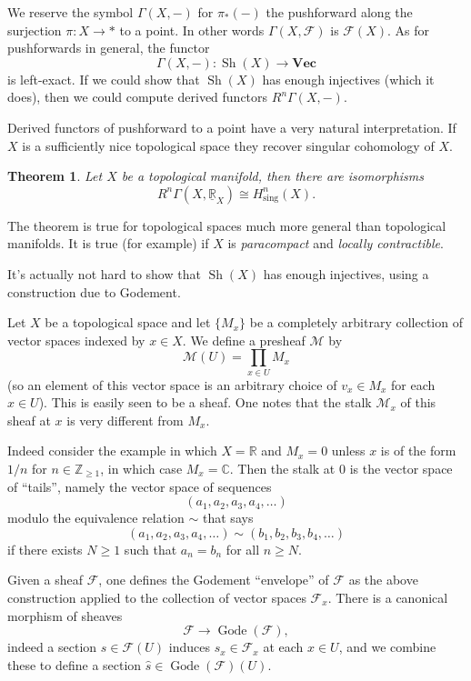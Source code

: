 \documentclass[12pt]{article}
\theoremstyle{plain}
\newtheorem{thm}{Theorem}[section]
\theoremstyle{definition}
\numberwithin{equation}{section}
\DeclareMathOperator{\Gode}{Gode}
\DeclareMathOperator{\sheaves}{Sh}
\newcommand{\C}{\mathbb{C}}
\newcommand{\R}{\mathbb{R}}
\newcommand{\Z}{\mathbb{Z}}
\newcommand{\CF}{\mathcal{F}}
\newcommand{\CM}{\mathcal{M}}
\newcommand{\Vect}{\mathbf{Vec}}
\begin{document}
We reserve the symbol $\Gamma(X, -)$ for $\pi_*(-)$ the pushforward along the surjection $\pi : X \rightarrow *$ to a point. In other words $\Gamma(X, \CF)$ is $\CF(X)$. As for pushforwards in general, the functor
\[
\Gamma(X, -) : \sheaves(X) \rightarrow \Vect
\]
is left-exact. If we could show that $\sheaves(X)$ has enough injectives (which it does), then we could compute derived functors $R^n\Gamma(X, -)$.

Derived functors of pushforward to a point have a very natural interpretation. If $X$ is a sufficiently nice topological space they recover singular cohomology of $X$.
\begin{thm}\label{thm:sheaf-sing-coho}
Let $X$ be a topological manifold, then there are isomorphisms
\[
R^n\Gamma(X, \underline{\R}_X) \cong H_{\text{sing}}^n(X).
\]
\end{thm}
The theorem is true for topological spaces much more general than topological manifolds. It is true (for example) if $X$ is \emph{paracompact} and \emph{locally contractible}.

It's actually not hard to show that $\sheaves(X)$ has enough injectives, using a construction due to Godement.

Let $X$ be a topological space and let $\{M_x\}$ be a completely arbitrary collection of vector spaces indexed by $x \in X$. We define a presheaf $\CM$ by
\[
\CM(U) = \prod_{x \in U} M_x
\]
(so an element of this vector space is an arbitrary choice of $v_x \in M_x$ for each $x \in U$). This is easily seen to be a sheaf. One notes that the stalk $\CM_x$ of this sheaf at $x$ is very different from $M_x$.

Indeed consider the example in which $X = \R$ and $M_x = 0$ unless $x$ is of the form $1/n$ for $n \in \Z_{\geq 1}$, in which case $M_x = \C$. Then the stalk at $0$ is the vector space of ``tails'', namely the vector space of sequences
\[
(a_1, a_2, a_3, a_4, \ldots)
\]
modulo the equivalence relation $\sim$ that says
\[
(a_1, a_2, a_3, a_4, \ldots) \sim (b_1, b_2, b_3, b_4, \ldots)
\]
if there exists $N \geq 1$ such that $a_n = b_n$ for all $n \geq N$.


Given a sheaf $\CF$, one defines the Godement ``envelope'' of $\CF$ as the above construction applied to the collection of vector spaces $\CF_x$. There is a canonical morphism of sheaves
\[
\CF \rightarrow \Gode(\CF),
\]
indeed a section $s \in \CF(U)$ induces $s_x \in \CF_x$ at each $x \in U$, and we combine these to define a section $\widehat{s} \in \Gode(\CF)(U)$.
\end{document}
